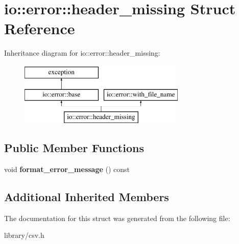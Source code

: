 \hypertarget{structio_1_1error_1_1header__missing}{}\section{io\+:\+:error\+:\+:header\+\_\+missing Struct Reference}
\label{structio_1_1error_1_1header__missing}
Inheritance diagram for io\+:\+:error\+:\+:header\+\_\+missing\+:\begin{figure}[H]
\begin{center}
\leavevmode
\includegraphics[height=3.000000cm]{structio_1_1error_1_1header__missing}
\end{center}
\end{figure}
\subsection*{Public Member Functions}
\begin{DoxyCompactItemize}
\item 
\mbox{\label{structio_1_1error_1_1header__missing_ae130d632556617cf136cc4392b517b30}} 
void {\bfseries format\+\_\+error\+\_\+message} () const
\end{DoxyCompactItemize}
\subsection*{Additional Inherited Members}


The documentation for this struct was generated from the following file\+:\begin{DoxyCompactItemize}
\item 
library/csv.\+h\end{DoxyCompactItemize}
